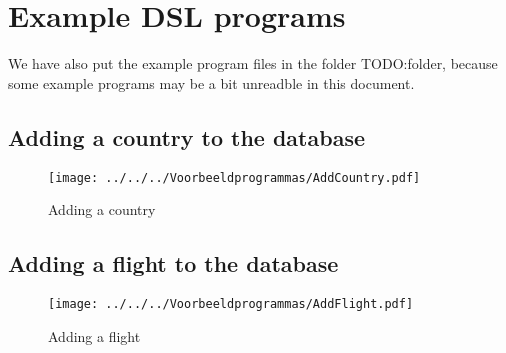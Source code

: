 \section{Example DSL programs}
We have also put the example program files in the folder TODO:folder, because some example programs may be a bit unreadble in this document.
\subsection{Adding a country to the database}
\begin{figure}[H]
	\centering
	\texttt{[image: ../../../Voorbeeldprogrammas/AddCountry.pdf]}
	\caption{Adding a country}
	\label{ex:addCountry}
\end{figure}

\subsection{Adding a flight to the database}
\begin{figure}[H]
	\centering
	\texttt{[image: ../../../Voorbeeldprogrammas/AddFlight.pdf]}
	\caption{Adding a flight}
	\label{ex:addFlight}
\end{figure}